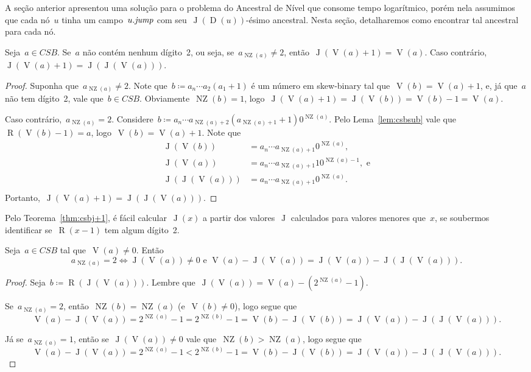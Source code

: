 \documentclass[main.tex]{subfiles}
\newcommand{\Dep}{\operatorname{D}}
\newcommand{\NZ}{\operatorname{NZ}}
\newcommand{\CSB}{\textit{CSB}}
\renewcommand{\V}{\operatorname{V}}
\newcommand{\R}{\operatorname{R}}
\newcommand{\J}{\operatorname{J}}
\begin{document}
A seção anterior apresentou uma solução para o problema do Ancestral de Nível que consome tempo logarítmico, porém nela assumimos que cada nó~$u$ tinha um campo~$u.\mathit{jump}$ com seu~\mbox{$\J(\Dep(u))$-ésimo} ancestral. Nesta seção, detalharemos como encontrar tal ancestral para cada nó.

\begin{theorem} \label{thm:csbj+1}
	Seja~$a \in \CSB$. Se~$a$ não contém nenhum dígito~2, ou seja, se~$a_{\NZ(a)} \neq 2$, então~$\J(\V(a) + 1) = \V(a)$. Caso contrário,~$\J(\V(a) + 1) = \J(\J(\V(a)))$.
\end{theorem}
\begin{proof}
	Suponha que~$a_{\NZ(a)} \neq 2$. Note que~$b \coloneqq a_n \cdots a_2 (a_1 + 1)$ é um número em skew-binary tal que~${\V(b) = \V(a) + 1}$, e, já que~$a$ não tem dígito~2, vale que~${b \in \CSB}$. Obviamente~${\NZ(b) = 1}$, logo~${\J(\V(a) + 1) = \J(\V(b)) = \V(b) - 1 = \V(a)}$.

	Caso contrário,~${a_{\NZ(a)} = 2}$. Considere~${b \coloneqq a_n \cdots a_{\NZ(a) + 2} (a_{\NZ(a) + 1} + 1) 0^{\NZ(a)}}$. Pelo Lema~\ref{lem:csbsub} vale que~${\R(\V(b) - 1) = a}$, logo~${\V(b) = \V(a) + 1}$. Note que \vspace{-2ex}
	\[
	\begin{array}{ll}
		\J(\V(b))     &= a_n \cdots a_{\NZ(a) + 1} 0^{\NZ(a)}, \\
		\J(\V(a))     &= a_n \cdots a_{\NZ(a) + 1} 10^{\NZ(a)-1},\text{ e} \\
		\J(\J(\V(a))) &= a_n \cdots a_{\NZ(a) + 1} 0^{\NZ(a)}. \\
	\end{array}
	\]
	Portanto,~$\J(\V(a) + 1) = \J(\J(\V(a)))$.
\end{proof}

Pelo Teorema~\ref{thm:csbj+1}, é fácil calcular~$\J(x)$ a partir dos valores~$\J$ calculados para valores menores que~$x$, se soubermos identificar se~$\R(x - 1)$ tem algum dígito~2.

\begin{proposition} \label{prop:csbjj}
	Seja~$a \in \CSB$ tal que~$\V(a) \neq 0$. Então \vspace{-2ex}
	$${a_{\NZ(a)} = 2 \iff \J(\V(a)) \neq 0 \text{ e } \V(a) - \J(\V(a)) = \J(\V(a)) - \J(\J(\V(a))).}$$
\end{proposition}
\begin{proof}
	Seja~$b \coloneqq \R(\J(\V(a)))$. Lembre que~${\J(\V(a)) = \V(a) - (2^{\NZ(a)} - 1)}$.

	Se~$a_{\NZ(a)} = 2$, então~$\NZ(b) = \NZ(a)$ (e~$\V(b) \neq 0$), logo segue que~$$\V(a) - \J(\V(a)) = 2^{\NZ(a)} - 1 = 2^{\NZ(b)} - 1 = \V(b) - \J(\V(b)) = \J(\V(a)) - \J(\J(\V(a))).$$

	Já se~$a_{\NZ(a)} = 1$, então se~$\J(\V(a)) \neq 0$ vale que~$\NZ(b) > \NZ(a)$, logo segue que~$$\V(a) - \J(\V(a)) = 2^{\NZ(a)} - 1 < 2^{\NZ(b)} - 1 = \V(b) - \J(\V(b)) = \J(\V(a)) - \J(\J(\V(a))).$$
\end{proof}
\end{document}
